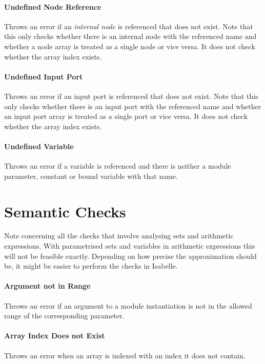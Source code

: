 \documentclass[a4paper,11pt,twoside]{report}
\begin{document}
{{{\paragraph{Undefined Node Reference}
Throws an error if an \emph{internal node} is referenced that does not exist.
Note that this only checks whether there is an internal node with the referenced name and whether a node array is treated as a single node or vice versa.
It does not check whether the array index exists.

\paragraph{Undefined Input Port}
Throws an error if an input port is referenced that does not exist.
Note that this only checks whether there is an input port with the referenced name and whether an input port array is treated as a single port or vice versa.
It does not check whether the array index exists.

\paragraph{Undefined Variable}
Throws an error if a variable is referenced and there is neither a module parameter, constant or bound variable with that name.

\section{Semantic Checks}

Note concerning all the checks that involve analysing sets and arithmetic expressions.
With parametrised sets and variables in arithmetic expressions this will not be feasible exactly.
Depending on how precise the approximation should be, it might be easier to perform the checks in Isabelle.

\paragraph{Argument not in Range}
Throws an error if an argument to a module instantiation is not in the allowed range of the corresponding parameter.

\paragraph{Array Index Does not Exist}
Throws an error when an array is indexed with an index it does not contain.

}}}
\end{document}
